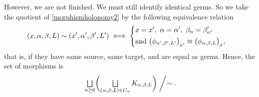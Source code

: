 \documentclass[10pt]{amsart}
\let\oldbigsqcup\bigsqcup
\renewcommand{\bigsqcup}{\mathop{\textstyle\oldbigsqcup}\displaylimits}
\theoremstyle{plain}
\theoremstyle{definition}
\theoremstyle{remark}
\numberwithin{equation}{section}
\let\uniondisjointe\bigsqcup
\begin{document}
However, we are not finished. We must still identify identical germs. So we take the quotient of \eqref{morphismholonomy2} by the following equivalence relation
\begin{equation}
\label{equiv}
(x,\alpha,\beta,L)\sim (x',\alpha',\beta',L')\iff
\left\{
\begin{aligned}
&x=x',\ \alpha=\alpha',\ \beta_n=\beta'_{n'}\cr
&\text{and }\big (\phi_{\alpha',\beta',L'}\big )_{x'}\equiv \big (\phi_{\alpha,\beta,L}\big )_x,
\end{aligned}
\right .
\end{equation}
that is, if they have same source, same target, and are equal as germs.
Hence, the set of morphisms is
\begin{equation}
\label{morphismholonomy3}
\uniondisjointe_{n\geq 0}\biggl (\uniondisjointe_{(\alpha,\beta, L) \in C_{n}} K_{\alpha,\beta, L}\biggr )\biggm /\sim.
\end{equation}
\end{document}

